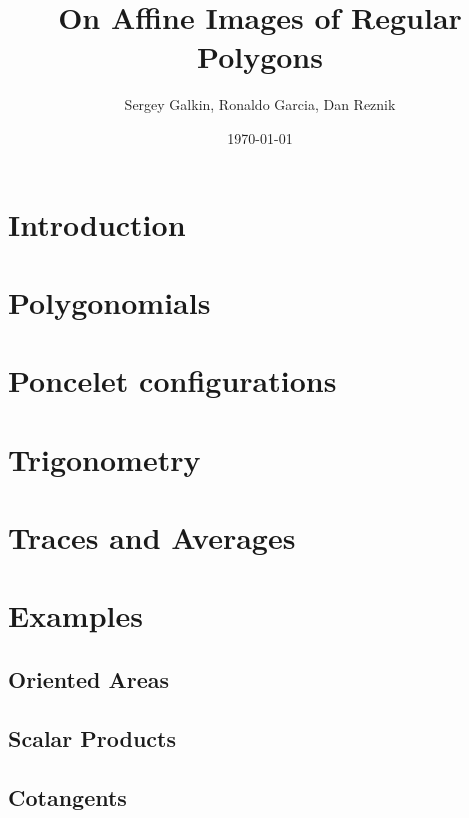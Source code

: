 \documentclass{scrartcl}
\date{\today}
\author{Sergey Galkin, Ronaldo Garcia, Dan Reznik}
\begin{document}
\title{On Affine Images of Regular Polygons}
\maketitle





\tableofcontents

\section{Introduction}
\label{sec:intro}


\section{Polygonomials}
\label{sec:polygonomials}


\section{Poncelet configurations}
\label{sec:poncelet}


\section{Trigonometry}
\label{sec:trigo}


\section{Traces and Averages}
\label{sec:traces}


\section{Examples}
\label{sec:examples}

\subsection{Oriented Areas}
\label{sec:areas}


\subsection{Scalar Products}
\label{sec:scalar}


\subsection{Cotangents}
\label{sec:cot}

\end{document}
